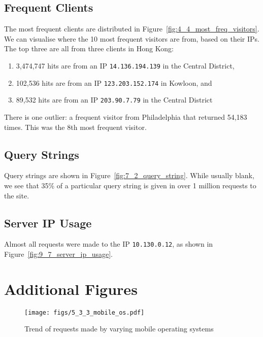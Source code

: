 \documentclass[12pt,titlepage]{article}
\begin{document}
\subsection{Frequent Clients}

The most frequent clients are distributed in Figure~\ref{fig:4_4_most_freq_visitors}. We can visualise where the 10 most frequent visitors are from, based on their IPs. The top three are all from three clients in Hong Kong:

\begin{enumerate}
  \item 3,474,747 hits are from an IP \texttt{14.136.194.139} in the Central District,
  \item 102,536 hits are from an IP \texttt{123.203.152.174} in Kowloon, and
  \item 89,532 hits are from an IP \texttt{203.90.7.79} in the Central District
\end{enumerate}

There is one outlier: a frequent visitor from Philadelphia that returned 54,183 times. This was the 8th most frequent visitor.

\subsection{Query Strings}

Query strings are shown in Figure~\ref{fig:7_2_query_string}. While usually blank, we see that 35\% of a particular query string is given in over 1 million requests to the site.

\subsection{Server IP Usage}

Almost all requests were made to the IP \texttt{10.130.0.12}, as shown in Figure~\ref{fig:9_7_server_ip_usage}.

\newpage
\appendix

\section{Additional Figures}

\begin{figure}[thbp]
  \centering
  \texttt{[image: figs/5\_3\_3\_mobile\_os.pdf]}
  \caption{Trend of requests made by varying mobile operating systems}
  \label{fig:5_3_3_mobile_os}
\end{figure}
\end{document}
